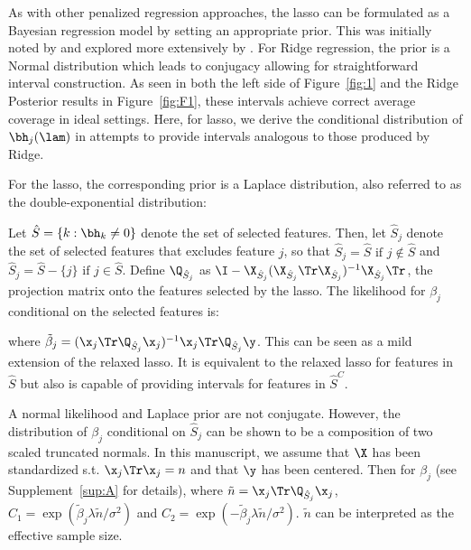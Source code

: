 As with other penalized regression approaches, the lasso can be formulated as a Bayesian regression model by setting an appropriate prior. This was initially noted by \cite{Tibshirani1996} and explored more extensively by \cite{Park2008}.  For Ridge regression, the prior is a Normal distribution which leads to conjugacy allowing for straightforward interval construction. As seen in both the left side of Figure~\ref{fig:1} and the Ridge Posterior results in Figure~\ref{fig:F1}, these intervals achieve correct average coverage in ideal settings. Here, for lasso, we derive the conditional distribution of $\bh_j(\lam)$ in attempts to provide intervals analogous to those produced by Ridge.

For the lasso, the corresponding prior is a Laplace distribution, also referred to as the double-exponential distribution:

Let $\hat{S} = \lbrace k: \bh_k \neq  0 \rbrace$ denote the set of selected features. Then, let $\hat{S}_j$ denote the set of selected features that excludes feature $j$, so that $\hat{S}_j = \hat{S} \text{ if } j \notin \hat{S}$ and $\hat{S}_j = \hat{S} - \lbrace j \rbrace \text{ if } j \in \hat{S}$. Define $\Q_{\hat{S}_j}$ as $\I - \X_{\hat{S}_j}(\X_{\hat{S}_j} \Tr \X_{\hat{S}_j})^{-1} \X_{\hat{S}_j} \Tr$, the projection matrix onto the features selected by the lasso. The likelihood for $\beta_j$ conditional on the selected features is:

\noindent where $\tilde{\beta}_j = (\x_j \Tr \Q_{\hat{S}_j} \x_j)^{-1} \x_j \Tr \Q_{\hat{S}_j} \y$.  This can be seen as a mild extension of the relaxed lasso. It is equivalent to the relaxed lasso for features in $\hat{S}$ but also is capable of providing intervals for features in $\hat{S}^C$.

A normal likelihood and Laplace prior are not conjugate. However, the distribution of $\beta_j$ conditional on $\hat{S}_j $ can be shown to be a composition of two scaled truncated normals. In this manuscript, we assume that $\X$ has been standardized s.t. $\x_j \Tr\x_j = n$ and that $\y$ has been centered. Then for $\beta_j$ (see Supplement~\ref{sup:A} for details),
where $\tilde{n} = \x_j \Tr \Q_{\hat{S}_j} \x_j$, $C_{1} = \exp(\tilde{\beta}_j \lambda \tilde{n}/\sigma^2)$ and $C_{2} = \exp(-\tilde{\beta}_j \lambda \tilde{n}/\sigma^2)$. $\tilde{n}$ can be interpreted as the effective sample size.

